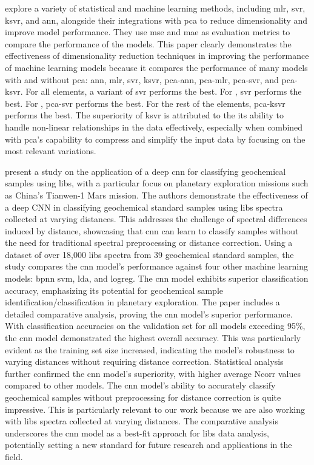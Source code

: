 \citet{rezaei_dimensionality_reduction} explore a variety of statistical and machine learning methods, including \gls{mlr}, \gls{svr}, \gls{ksvr}, and \gls{ann}, alongside their integrations with \gls{pca} to reduce dimensionality and improve model performance.
They use \gls{mse} and \gls{mae} as evaluation metrics to compare the performance of the models.
This paper clearly demonstrates the effectiveness of dimensionality reduction techniques in improving the performance of machine learning models because it compares the performance of many models with and without \gls{pca}: \gls{ann}, \gls{mlr}, \gls{svr}, \gls{ksvr}, \gls{pca}-\gls{ann}, \gls{pca}-\gls{mlr}, \gls{pca}-\gls{svr}, and \gls{pca}-\gls{ksvr}.
For all elements, a variant of \gls{svr} performs the best.
For , \gls{svr} performs the best.
For , \gls{pca}-\gls{svr} performs the best.
For the rest of the elements, \gls{pca}-\gls{ksvr} performs the best.
The superiority of \gls{ksvr} is attributed to the its ability to handle non-linear relationships in the data effectively, especially when combined with \gls{pca}'s capability to compress and simplify the input data by focusing on the most relevant variations.

\citet{yang_laser-induced_2022} present a study on the application of a deep \gls{cnn} for classifying geochemical samples using \gls{libs}, with a particular focus on planetary exploration missions such as China's Tianwen-1 Mars mission.
The authors demonstrate the effectiveness of a deep CNN in classifying geochemical standard samples using \gls{libs} spectra collected at varying distances.
This addresses the challenge of spectral differences induced by distance, showcasing that \gls{cnn} can learn to classify samples without the need for traditional spectral preprocessing or distance correction.
Using a dataset of over 18,000 \gls{libs} spectra from 39 geochemical standard samples, the study compares the \gls{cnn} model's performance against four other machine learning models: \gls{bpnn} \gls{svm}, \gls{lda}, and \gls{logreg}.
The \gls{cnn} model exhibits superior classification accuracy, emphasizing its potential for geochemical sample identification/classification in planetary exploration.
The paper includes a detailed comparative analysis, proving the \gls{cnn} model's superior performance.
With classification accuracies on the validation set for all models exceeding 95\%, the \gls{cnn} model demonstrated the highest overall accuracy.
This was particularly evident as the training set size increased, indicating the model's robustness to varying distances without requiring distance correction.
Statistical analysis further confirmed the \gls{cnn} model's superiority, with higher average Ncorr values compared to other models.
The \gls{cnn} model's ability to accurately classify geochemical samples without preprocessing for distance correction is quite impressive.
This is particularly relevant to our work because we are also working with \gls{libs} spectra collected at varying distances.
The comparative analysis underscores the \gls{cnn} model as a best-fit approach for \gls{libs} data analysis, potentially setting a new standard for future research and applications in the field.

